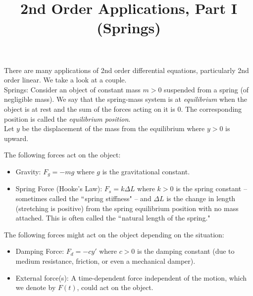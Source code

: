\documentclass{ximera}
\begin{document}
\begin{abstract}
 \end{abstract}

    \title{2nd Order Applications, Part I (Springs)}
    
    \maketitle

 There are many applications of 2nd order differential equations, particularly 2nd order linear.  We take a look at a couple.\\

 Springs:  Consider an object of constant mass $m>0$ suspended from a spring (of negligible mass).  We say that the spring-mass system is at \emph{equilibrium}  when the object is at rest and the sum of the forces acting on it is $0$.  The corresponding position is called the \emph{equilibrium position}.\\

 Let $y$ be the displacement of the mass from the equilibrium where $y>0$ is upward.\\


\vfill



 The following forces act on the object:\\


\begin{itemize}

 \item Gravity:  $F_{g}=-mg$ where $g$ is the gravitational constant.\\


 \item Spring Force (Hooke's Law):  $F_{s}=k\Delta L$ where $k>0$ is the spring constant -- sometimes called the $``$spring stiffness" --  and $\Delta L$ is the change in length (stretching is positive) from the spring equilibrium position with no mass attached.  This is often called the $``$natural length of the spring."\\


\end{itemize}

\vfill


 The following forces might act on the object depending on the situation:\\

 \begin{itemize}

 \item Damping Force:  $F_{d}=-cy'$ where $c>0$ is the damping constant (due to medium resistance, friction, or even a mechanical damper).\\

\item External force(s):  A time-dependent force independent of the motion, which we denote by $F(t)$, could act on the object.\\

 \end{itemize}
\end{document}
